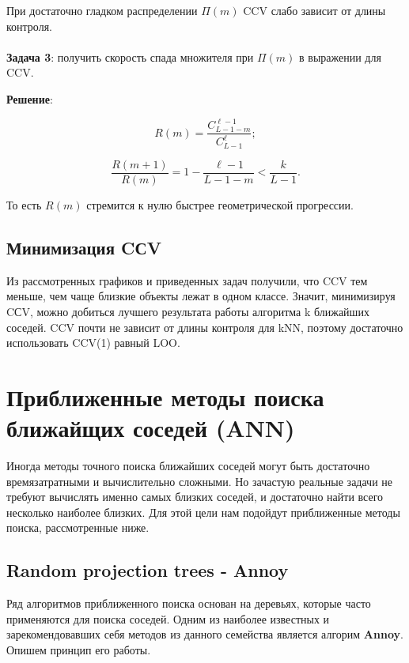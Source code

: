 \noindent
При достаточно гладком распределении $\Pi(m)$ CCV слабо зависит от длины контроля.  \\ \\

\noindent
\textbf{Задача 3}: получить скорость спада множителя при $\Pi(m)$ в выражении для CCV.

\noindent
\textbf{Решение}:

\begin{equation*}
	R(m)=\frac{C_{L-1-m}^{\ell-1}}{C_{L-1}^{\ell}};
\end{equation*}

\begin{equation*}
	\frac{R(m+1)}{R(m)}=1-\frac{\ell-1}{L-1-m}<\frac{k}{L-1} .
\end{equation*}

\noindent
То есть $R(m)$ стремится к нулю быстрее геометрической прогрессии.


\subsection{Минимизация CСV}

Из рассмотренных графиков и приведенных задач получили, что 
$\mathrm{CCV}$ тем меньше, чем чаще близкие объекты лежат в одном классе. Значит, минимизируя CСV, можно добиться лучшего результата работы алгоритма k ближайших соседей. CCV почти не зависит от длины контроля для kNN, поэтому достаточно использовать CCV(1) равный LOO.


\section*{Приближенные методы поиска ближайщих соседей (ANN)}

Иногда методы точного поиска ближайших соседей могут быть достаточно времязатратными и вычислительно сложными. Но зачастую реальные задачи не требуют вычислять именно самых близких соседей, и достаточно найти всего несколько наиболее близких. Для этой цели нам подойдут приближенные методы поиска, рассмотренные ниже.

\subsection{Random projection trees - \textbf{Annoy}}

Ряд алгоритмов приближенного поиска основан на деревьях, которые часто применяются для поиска соседей. Одним из наиболее известных и зарекомендовавших себя методов из данного семейства является алгорим \textbf{Annoy}. Опишем принцип его работы.

